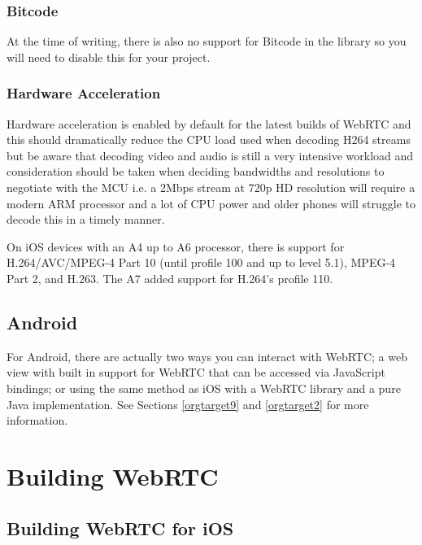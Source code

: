 \documentclass[a4paper,11pt]{article}
\begin{document}
\subsubsection{Bitcode}
\label{sec:orgheadline34}

At the time of writing, there is also no support for Bitcode in the
library so you will need to disable this for your project.

\subsubsection{Hardware Acceleration}
\label{sec:orgheadline35}

Hardware acceleration is enabled by default for the latest builds of
WebRTC and this should dramatically reduce the CPU load used when
decoding H264 streams but be aware that decoding video and audio is
still a very intensive workload and consideration should be taken when
deciding bandwidths and resolutions to negotiate with the MCU i.e. a
2Mbps stream at 720p HD resolution will require a modern ARM processor
and a lot of CPU power and older phones will struggle to decode this
in a timely manner.

On iOS devices with an A4 up to A6 processor, there is support for
H.264/AVC/MPEG-4 Part 10 (until profile 100 and up to level 5.1),
MPEG-4 Part 2, and H.263.  The A7 added support for H.264’s
profile 110.

\subsection{Android}
\label{sec:orgheadline37}

For Android, there are actually two ways you can interact with WebRTC;
a web view with built in support for WebRTC that can be accessed via
JavaScript bindings; or using the same method as iOS with a WebRTC
library and a pure Java implementation.  See Sections
\ref{orgtarget9} and \ref{orgtarget2} for more
information.

\section{Building WebRTC}
\label{sec:orgheadline51}

\label{orgtarget8}

\subsection{Building WebRTC for iOS}
\label{sec:orgheadline49}
\end{document}
